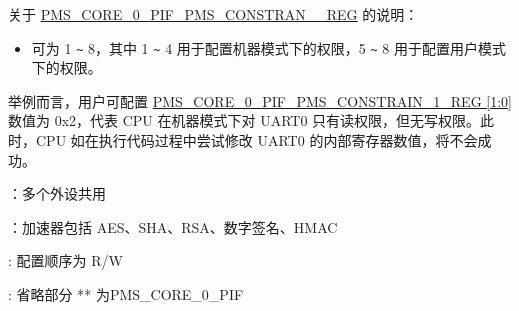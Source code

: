 \documentclass[main\_\_CN.tex]{subfiles}
\begin{document}
关于 \hyperref[regdesc:PMSCORE0PIFPMSCONSTRAIN1REG]{PMS\_CORE\_0\_PIF\_PMS\_CONSTRAN\_\_REG} 的说明：
\begin{itemize}
    \item {} 可为 1 \verb+~+ 8，其中 1 \verb+~+ 4 用于配置机器模式下的权限，5 \verb+~+ 8 用于配置用户模式下的权限。
\end{itemize}

举例而言，用户可配置 \hyperref[regdesc:PMSCORE0PIFPMSCONSTRAIN1REG]{PMS\_CORE\_0\_PIF\_PMS\_CONSTRAIN\_1\_REG [1:0]} 数值为 0x2，代表 CPU 在机器模式下对 UART0 只有读权限，但无写权限。此时，CPU 如在执行代码过程中尝试修改 UART0 的内部寄存器数值，将不会成功。

\begin{ThreePartTable}

\begin{TableNotes}
\item[1]：多个外设共用
\item[2]：加速器包括 AES、SHA、RSA、数字签名、HMAC
\item[3]: 配置顺序为 R/W
\item[4]: 省略部分 ** 为PMS\_CORE\_0\_PIF
\end{TableNotes}


\end{ThreePartTable}
\end{document}
